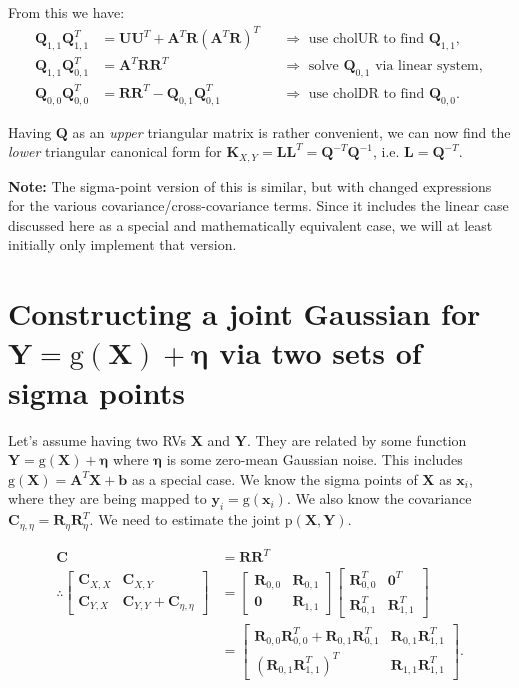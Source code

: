 \documentclass[oneside,english]{scrbook}
\begin{document}
From this we have:
\begin{align*}
  \bm{Q}_{1,1}\bm{Q}_{1,1}^T
  &= \bm{U}\bm{U}^T + \bm{A}^T\bm{R}(\bm{A}^T\bm{R})^T
  && \Longrightarrow \text{ use cholUR to find $\bm{Q}_{1,1}$},\\
  \bm{Q}_{1,1}\bm{Q}_{0,1}^T
  &= \bm{A}^T\bm{R}\bm{R}^T
  && \Longrightarrow \text{ solve $\bm{Q}_{0,1}$ via linear system},\\
  \bm{Q}_{0,0}\bm{Q}_{0,0}^T
  &= \bm{R}\bm{R}^T - \bm{Q}_{0,1}\bm{Q}_{0,1}^T
  && \Longrightarrow \text{ use cholDR to find $\bm{Q}_{0,0}$}.
\end{align*}

Having $\bm{Q}$ as an \emph{upper} triangular matrix is rather convenient, we
can now find the \emph{lower} triangular canonical form for $\bm{K}_{X,Y} =
\bm{L}\bm{L}^T = \bm{Q}^{-T}\bm{Q}^{-1}$, i.e. $\bm{L} = \bm{Q}^{-T}$.

\textbf{Note:} The sigma-point version of this is similar, but with
changed expressions for the various covariance/cross-covariance
terms. Since it includes the linear case discussed here as a special
and mathematically equivalent case, we will at least initially only
implement that version.

\section{Constructing a joint Gaussian for $\bm{Y} = \text{g}(\bm{X})+ \bm{\eta}$
  via two sets of sigma points}
Let's assume having two RVs $\bm{X}$ and $\bm{Y}$. They are related by
some function $\bm{Y} = \text{g}(\bm{X})+ \bm{\eta}$ where $\bm{\eta}$
is some zero-mean Gaussian noise. This includes $\text{g}(\bm{X}) =
\bm{A}^T\bm{X} + \bm{b}$ as a special case. We know the sigma points
of $\bm{X}$ as $\bm{x}_i$, where they are being mapped to $\bm{y}_i =
\text{g}(\bm{x}_i)$. We also know the covariance $\bm{C}_{\eta,\eta} =
\bm{R}_\eta\bm{R}^T_\eta$. We need to estimate the joint
$\text{p}(\bm{X},\bm{Y})$.

\begin{align*}
  \bm{C}
  &= \bm{R}\bm{R}^{T}\\
  \therefore
  \begin{bmatrix}
    \bm{C}_{X,X} & \bm{C}_{X,Y} \\
    \bm{C}_{Y,X} & \bm{C}_{Y,Y} + \bm{C}_{\eta,\eta}
  \end{bmatrix}
  &=
    \begin{bmatrix}
    \bm{R}_{0,0} & \bm{R}_{0,1}\\
    \bm{0} & \bm{R}_{1,1}
  \end{bmatrix}
  \begin{bmatrix}
    \bm{R}_{0,0}^T & \bm{0}^T\\
    \bm{R}_{0,1}^T & \bm{R}_{1,1}^T
  \end{bmatrix}\\
  &=
  \begin{bmatrix}
    \bm{R}_{0,0}\bm{R}_{0,0}^T+ \bm{R}_{0,1}\bm{R}_{0,1}^T & \bm{R}_{0,1}\bm{R}_{1,1}^T\\
    (\bm{R}_{0,1}\bm{R}_{1,1}^T)^T & \bm{R}_{1,1}\bm{R}_{1,1}^T
  \end{bmatrix}.
\end{align*}
\end{document}
